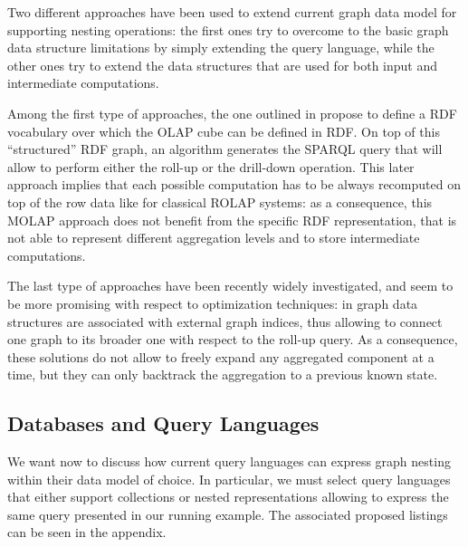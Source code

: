  Two different approaches have been used to extend current graph data model for supporting nesting operations:
the first ones try to overcome to the basic graph data structure limitations by simply extending the query language, while the other ones try to extend the data structures that are used for both input and intermediate computations. 


Among the first type of approaches, the one outlined in \cite{Etcheverry2012} propose to define a RDF vocabulary over which the OLAP cube can be defined in RDF. On top of this ``structured'' RDF graph, an algorithm generates the SPARQL query that will allow to perform either the roll-up or the drill-down operation. This later approach implies that each possible computation has to be always recomputed on top of the row data like for classical ROLAP systems: as a consequence, this MOLAP approach does not benefit from the specific RDF representation, that is not able to represent different aggregation levels and to store intermediate computations.

The last type of approaches have been recently widely investigated, and seem to be more promising with respect to optimization techniques: in \cite{Tian20085,ChenYZHY08,Qu2011} graph data structures are associated with external graph indices, thus allowing to connect one graph  to its broader one with respect to the roll-up query. As a consequence, these solutions do not allow to freely expand any aggregated component at a time, but they can only backtrack the aggregation to a previous known state. %


\subsection{Databases and Query Languages}\label{subsec:pathsumm}
We want now to discuss how current query languages can express graph nesting  within their data model of choice. In particular, we must select query languages that either support collections or nested representations allowing to express the same query presented in our running example. The associated proposed listings can be seen in the appendix.

